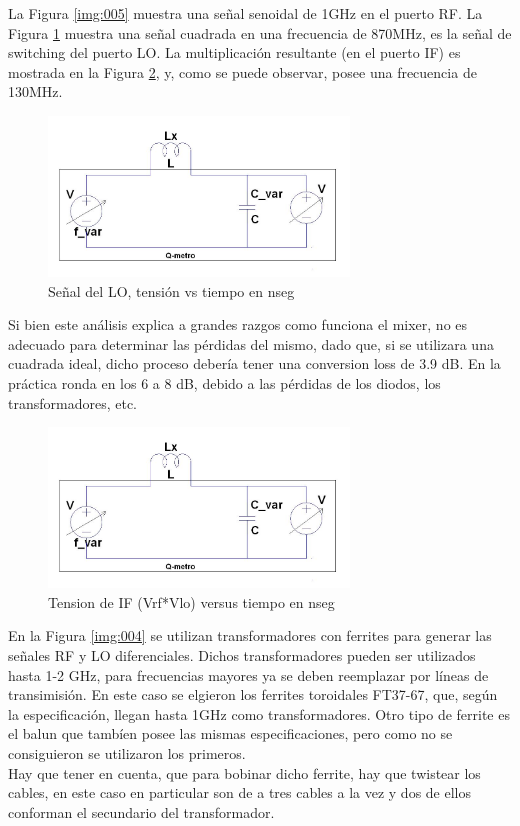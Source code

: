\documentclass[a4paper,10pt]{article}
\begin{document}
	\indent La Figura \ref{img:005} muestra una señal senoidal de 1GHz en el
	puerto RF. La Figura \ref{img:006} muestra una señal cuadrada en una 
	frecuencia de 870MHz, es la señal de switching del puerto LO. La 
	multiplicación resultante (en el puerto IF) es mostrada en la Figura 
	\ref{img:007}, y, como se puede observar, posee una frecuencia de 130MHz. \\
	
	\begin{figure}[!htb]
		\centering
		\includegraphics[width=8cm]{Images/qmetro.png}
		\caption{Señal del LO, tensión vs tiempo en nseg}
		\label{img:006}
	\end{figure}
	
	\indent Si bien este análisis explica a grandes razgos como funciona el 
	mixer, no es adecuado para determinar las pérdidas del mismo, dado que, si 
	se utilizara una cuadrada ideal, dicho proceso debería tener una conversion
	loss de 3.9 dB. En la práctica ronda en los 6 a 8 dB, debido a las pérdidas
	de los diodos, los transformadores, etc. \\
	
	\begin{figure}[!htb]
		\centering
		\includegraphics[width=8cm]{Images/qmetro.png}
		\caption{Tension de IF (Vrf*Vlo) versus tiempo en nseg}
		\label{img:007}
	\end{figure}

	\indent En la Figura \ref{img:004} se utilizan transformadores con ferrites 
	para generar las señales RF y LO diferenciales. Dichos transformadores 
	pueden ser utilizados hasta 1-2 GHz, para frecuencias mayores ya se deben 
	reemplazar por líneas de transimisión. En este caso se elgieron los 
	ferrites toroidales FT37-67, que, según la especificación, llegan hasta 1GHz
	como transformadores. Otro tipo de ferrite es el balun que tambíen posee las
	mismas especificaciones, pero como no se consiguieron se utilizaron los 
	primeros.\\
	\indent Hay que tener en cuenta, que para bobinar dicho ferrite, hay que 
	twistear los cables, en este caso en particular son de a tres cables a la 
	vez y dos de ellos conforman el secundario del transformador.
\end{document}
